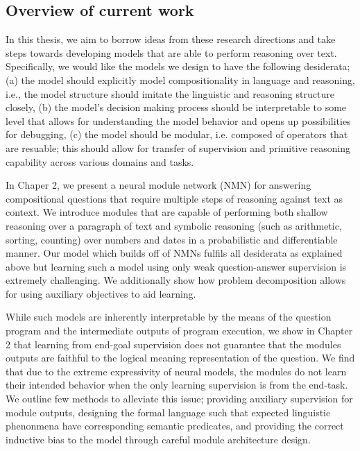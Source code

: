 \documentclass[main.tex]{subfiles}
\begin{document}


\subsection{Overview of current work}
In this thesis, we aim to borrow ideas from these research directions and take steps towards developing models that are able to perform reasoning over text.  Specifically, we would like the models we design to have the following desiderata; (a) the model should explicitly model compositionality in language and reasoning, i.e., the model structure should imitate the linguistic and reasoning structure closely, (b) the model's decision making process should be interpretable to some level that allows for understanding the model behavior and opens up possibilities for debugging, (c) the model should be modular, i.e. composed of operators that are resuable; this should allow for transfer of supervision and primitive reasoning capability across various domains and tasks.

In Chaper 2, we present a neural module network (NMN) for answering compositional questions that require multiple steps of reasoning against text as context.  We introduce modules that are capable of performing both shallow reasoning over a paragraph of text and symbolic reasoning (such as arithmetic, sorting, counting) over numbers and dates in a probabilistic and differentiable manner.  Our model which builds off of NMNs fulfils all desiderata as explained above but learning such a model using only weak question-answer supervision is extremely challenging.  We additionally show how problem decomposition allows for using auxiliary objectives to aid learning.

While such models are inherently interpretable by the means of the question program and the intermediate outputs of program execution, we show in Chapter 2 that learning from end-goal supervision does not guarantee that the modules outputs are faithful to the logical meaning representation of the question.  We find that due to the extreme expressivity of neural models, the modules do not learn their intended behavior when the only learning supervision is from the end-task.  We outline few methods to alleviate this issue; providing auxiliary supervision for module outputs, designing the formal language such that expected linguistic phenonmena have corresponding semantic predicates, and providing the correct inductive bias to the model through careful module architecture design.
\end{document}
